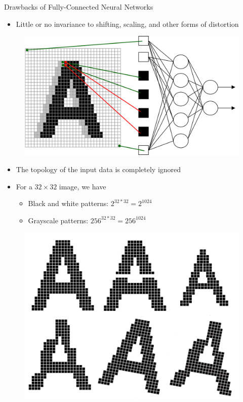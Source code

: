 \begin{frame}[allowframebreaks]{Drawbacks of Fully-Connected Neural Networks}
\framebreak

    \begin{itemize}
        \item Little or no invariance to shifting, scaling, and other forms of distortion
    \end{itemize}

    \begin{figure}
    \centering
    \includegraphics[width=1.0\textwidth,height=0.7\textheight,keepaspectratio]{images/cnn/nn_4.png}
    \end{figure}

\framebreak

    \begin{itemize}
        \item The topology of the input data is completely ignored
        \item For a $32 \times 32$ image, we have
        \begin{itemize}
            \item Black and white patterns: $2^{32*32} = 2^{1024}$
            \item Grayscale patterns: $256^{32*32} = 256^{1024}$
        \end{itemize}
    \end{itemize}

    \begin{figure}
    \centering
    \includegraphics[width=1.0\textwidth,height=0.6\textheight,keepaspectratio]{images/cnn/nn_5.png}
    \end{figure}


\end{frame}
